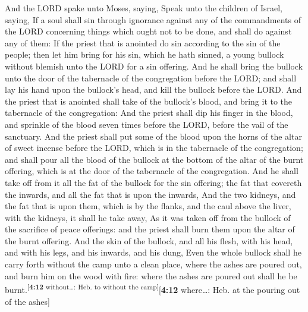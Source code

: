  And the LORD spake unto Moses, saying, 
Speak unto the children of Israel, saying, If a soul shall sin through
ignorance against any of the commandments of the LORD concerning things
which ought not to be done, and shall do against any of them:
 If the priest that is anointed do sin according to the
sin of the people; then let him bring for his sin, which he hath sinned,
a young bullock without blemish unto the LORD for a sin offering.
 And he shall bring the bullock unto the door of the
tabernacle of the congregation before the LORD; and shall lay his hand
upon the bullock's head, and kill the bullock before the LORD.
 And the priest that is anointed shall take of the
bullock's blood, and bring it to the tabernacle of the congregation:
 And the priest shall dip his finger in the blood, and
sprinkle of the blood seven times before the LORD, before the vail of
the sanctuary.  And the priest shall put some of the blood
upon the horns of the altar of sweet incense before the LORD, which is
in the tabernacle of the congregation; and shall pour all the blood of
the bullock at the bottom of the altar of the burnt offering, which is
at the door of the tabernacle of the congregation.  And he
shall take off from it all the fat of the bullock for the sin offering;
the fat that covereth the inwards, and all the fat that is upon the
inwards,  And the two kidneys, and the fat that is upon
them, which is by the flanks, and the caul above the liver, with the
kidneys, it shall he take away,  As it was taken off from
the bullock of the sacrifice of peace offerings: and the priest shall
burn them upon the altar of the burnt offering.  And the
skin of the bullock, and all his flesh, with his head, and with his
legs, and his inwards, and his dung,  Even the whole
bullock shall he carry forth without the camp unto a clean place, where
the ashes are poured out, and burn him on the wood with fire: where the
ashes are poured out shall he be burnt.\textsuperscript{{[}\textbf{4:12}
without\ldots: Heb. to without the camp{]}}{[}\textbf{4:12} where\ldots:
Heb. at the pouring out of the ashes{]}

